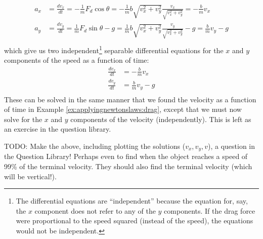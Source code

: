 \begin{align*}
a_x&=\frac{dv_x}{dt}=-\frac{1}{m}F_d\cos\theta=-\frac{1}{m}b\sqrt{v_x^2+v_y^2}\frac{v_x}{\sqrt{v_x^2+v_y^2}}=-\frac{b}{m}v_x\\
a_y&=\frac{dv_y}{dt}=\frac{1}{m}F_d\sin\theta-g=\frac{1}{m}b\sqrt{v_x^2+v_y^2}\frac{v_y}{\sqrt{v_x^2+v_y^2}}-g=\frac{b}{m}v_y-g\\
\end{align*}
which give us two independent\footnote{The differential equations are ``independent'' because the equation for, say, the $x$ component does not refer to any of the $y$ components. If the drag force were proportional to the speed squared (instead of the speed), the equations would not be independent.} separable differential equations for the $x$ and $y$ components of the speed as a function of time:
\begin{align*}
\frac{dv_x}{dt} &=-\frac{b}{m}v_x\\
\frac{dv_y}{dt} &= \frac{b}{m}v_y-g\\
\end{align*}
These can be solved in the same manner that we found the velocity as a function of time in Example \ref{ex:applyingnewtonslaws:drag}, except that we must now solve for the $x$ and $y$ components of the velocity (independently). This is left as an exercise in the question library.

TODO: Make the above, including plotting the solutions ($v_x, v_y, v$), a question in the Question Library! Perhaps even to find when the object reaches a speed of 99\% of the terminal velocity. They should also find the terminal velocity (which will be vertical!).



